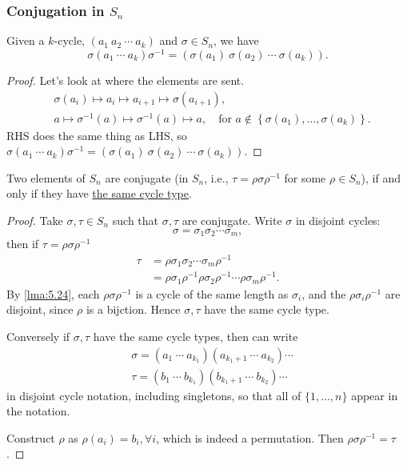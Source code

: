 \documentclass[a4paper]{article}
\begin{document}
      \subsubsection{Conjugation in $S_n$}
      \begin{lemma}\label{lma:5.24}
            Given a $k$-cycle, $(a_1\ a_2\ \cdots\ a_k)$ and $ \sigma\in S_n $, we have 
            \[
                \sigma(a_1\ \cdots \ a_k)\sigma^{-1}=(\sigma(a_1)\ \sigma(a_2)\ \cdots\ \sigma(a_k))
            .\]
      \end{lemma}
      \begin{proof}
          Let's look at where the elements are sent.
          \[
             \begin{aligned}
                  &\sigma(a_i) \mapsto a_i \mapsto a_{i+1} \mapsto \sigma(a_{i+1}),\\
                  &a \mapsto \sigma^{-1}(a) \mapsto \sigma^{-1}(a) \mapsto a,\quad \text{for $a\notin \left\{ \sigma(a_1),\dots, \sigma(a_k) \right\}$.}
             \end{aligned}
          \]
          RHS does the same thing as LHS, so $ \sigma(a_1\ \cdots \ a_k)\sigma^{-1}=(\sigma(a_1)\ \sigma(a_2)\ \cdots\ \sigma(a_k)) $.
      \end{proof}
      \begin{proposition}\label{prop:5.25}
          Two elements of $S_n$ are conjugate (in $S_n$, i.e., $\tau=\rho\sigma\rho^{-1}$ for some $\rho \in S_n$), if and only if they have \underline{the same cycle type}.
      \end{proposition}
      \begin{proof}
          Take $ \sigma, \tau\in S_n $ such that $ \sigma, \tau $ are conjugate. Write $ \sigma $ in disjoint cycles:
          \[
              \sigma=\sigma_1\sigma_2\cdots \sigma_m
          ,\]
          then if $ \tau=\rho\sigma\rho^{-1} $
          \[
            \begin{aligned}
                \tau&=\rho\sigma_1\sigma_2\cdots \sigma_m\rho^{-1}\\
                &= \rho\sigma_1\rho^{-1}\rho\sigma_2\rho^{-1}\cdots \rho\sigma_m\rho^{-1}.
            \end{aligned}
          \]
          By \ref{lma:5.24}, each $ \rho\sigma\rho^{-1} $ is a cycle of the same length as $\sigma_i$, and the $ \rho\sigma_i\rho^{-1} $ are disjoint, since $\rho$ is a bijction. Hence $ \sigma,\tau $ have the same cycle type.

          Conversely if $\sigma,\tau$ have the same cycle types, then can write 
          \[
            \begin{aligned}
                &\sigma= (a_1\ \cdots\ a_{k_1})(a_{k_1+1}\ \cdots\ a_{k_2})\cdots\\
                &\tau = (b_1\ \cdots\ b_{k_1})(b_{k_1+1}\ \cdots\ b_{k_2})\cdots
            \end{aligned}
          \]
          in disjoint cycle notation, including singletons, so that all of $\{1,\dots,n\}$ appear in the notation.

          Construct $ \rho $ as $ \rho(a_i)=b_i, \forall i$, which is indeed a permutation. Then $ \rho\sigma\rho^{-1}=\tau $.
      \end{proof}
\end{document}

